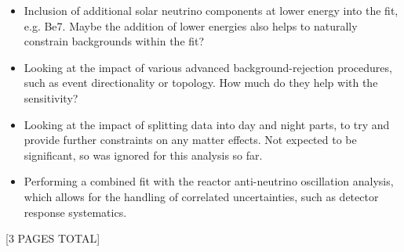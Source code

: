 {\begin{itemize}
\begin{itemize}
        \item Inclusion of additional solar neutrino components at lower energy into the fit, e.g. Be7. Maybe the addition of lower energies also helps to naturally constrain backgrounds within the fit?
        \item Looking at the impact of various advanced background-rejection procedures, such as event directionality or topology. How much do they help with the sensitivity?
        \item Looking at the impact of splitting data into day and night parts, to try and provide further constraints on any matter effects. Not expected to be significant, so was ignored for this analysis so far. 
        \item Performing a combined fit with the reactor anti-neutrino oscillation analysis, which allows for the handling of correlated uncertainties, such as detector response systematics.
    \end{itemize}
\end{itemize}
[3 PAGES TOTAL]
}